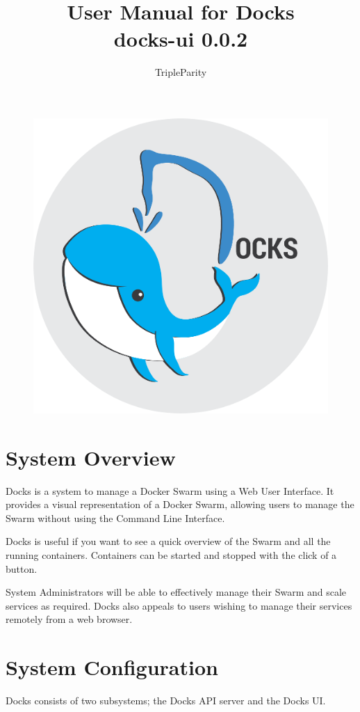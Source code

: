 \documentclass[]{article}
\title{User Manual for Docks\\
\large{docks-ui 0.0.2}}
\author{TripleParity}
\date{}
\begin{document}
\maketitle

\begin{figure}[H]
	\includegraphics[scale=0.7]{docks_round_512.png}
	\centering
\end{figure}

\tableofcontents

\section{System Overview}
Docks is a system to manage a Docker Swarm using a Web User Interface. It provides a visual representation of a Docker Swarm, allowing users to manage the Swarm without using the Command Line Interface.

Docks is useful if you want to see a quick overview of the Swarm and all the running containers. Containers can be started and stopped with the click of a button.

System Administrators will be able to effectively manage their Swarm and scale services as required. Docks also appeals to users wishing to manage their services remotely from a web browser.

\section{System Configuration}
Docks consists of two subsystems; the Docks API server and the Docks UI.
\end{document}
